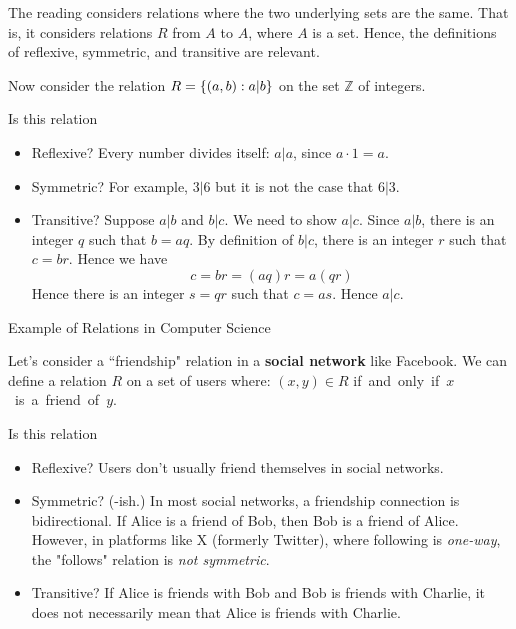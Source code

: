 \documentclass[10pt]{beamer}
\begin{document}
\begin{frame}

\footnotesize 
\begin{myredbox}[title=Remark]
The reading considers relations where the two underlying sets are the same.  That is, it considers relations $R$ from $A$ to $A$, where  $A$ is a set.  Hence, the definitions of reflexive, symmetric, and transitive are relevant.
\end{myredbox}
\vfill 
\begin{myyellowbox}[title=Poll]
Now consider the relation $R=\{ {(a,b): a|b} \}$ on the set $\mathbb{Z}$ of integers. 

Is this relation 
\begin{itemize}
\item Reflexive? \pause \greencheck Every number divides itself: $a|a$, since $a \cdot 1 = a$.
\item Symmetric? \pause \redx  For example, $3|6$ but it is not the case that $6|3$.
\item Transitive? \pause \greencheck    Suppose $a|b$ and $b|c$.  We need to show $a|c$.  Since $a|b$, there is an integer $q$ such that $b=aq$.  By definition of $b|c$, there is an integer $r$ such that $c=br$.  Hence we have 
\[ c=br = (aq)r = a(qr)\]
Hence there is an integer $s=qr$ such that $c=as$.  Hence $a|c$.  	
\end{itemize}
\end{myyellowbox}


\end{frame}



\begin{frame}{Example of Relations in Computer Science}
\footnotesize 
\begin{mygreenbox}[title=Example]

Let's consider a ``friendship" relation in a \textbf{social network} like Facebook. We can define a relation $R$ on a set of users where: $(x,y) \in R$ if and only if $x$ is a friend of $y$. 
\end{mygreenbox}

\begin{myyellowbox}[title=Poll]
Is this relation
\begin{itemize}
\item Reflexive? \pause \redx Users don't usually friend themselves in social networks. 
\item Symmetric? \pause \greencheck(-ish.) In most social networks, a friendship connection is bidirectional. If Alice is a friend of Bob, then Bob is a friend of Alice.  However, in platforms like X (formerly Twitter), where following is \textit{one-way}, the "follows" relation is \textit{not symmetric}.
\item Transitive? \pause \redx If  Alice is friends with Bob and Bob is friends with Charlie, it does not necessarily mean that Alice is friends with Charlie.  %
\end{itemize}
\end{myyellowbox}
	
\end{frame}
\end{document}
